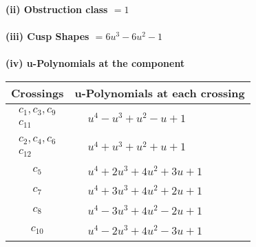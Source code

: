 \documentclass[1p]{elsarticle_modified}
\theoremstyle{definition}
\begin{document}
\flushleft \textbf{(ii) Obstruction class $= 1$}\\~\\
\flushleft \textbf{(iii) Cusp Shapes $= 6 u^3-6 u^2-1$}\\~\\
\newpage\renewcommand{\arraystretch}{1}
\flushleft \textbf{(iv) u-Polynomials at the component}\newline \\
\begin{tabular}{m{50pt}|m{274pt}}
Crossings & \hspace{64pt}u-Polynomials at each crossing \\
\hline $$\begin{aligned}c_{1},c_{3},c_{9}\\c_{11}\end{aligned}$$&$\begin{aligned}
&u^4- u^3+u^2- u+1
\end{aligned}$\\
\hline $$\begin{aligned}c_{2},c_{4},c_{6}\\c_{12}\end{aligned}$$&$\begin{aligned}
&u^4+u^3+u^2+u+1
\end{aligned}$\\
\hline $$\begin{aligned}c_{5}\end{aligned}$$&$\begin{aligned}
&u^4+2 u^3+4 u^2+3 u+1
\end{aligned}$\\
\hline $$\begin{aligned}c_{7}\end{aligned}$$&$\begin{aligned}
&u^4+3 u^3+4 u^2+2 u+1
\end{aligned}$\\
\hline $$\begin{aligned}c_{8}\end{aligned}$$&$\begin{aligned}
&u^4-3 u^3+4 u^2-2 u+1
\end{aligned}$\\
\hline $$\begin{aligned}c_{10}\end{aligned}$$&$\begin{aligned}
&u^4-2 u^3+4 u^2-3 u+1
\end{aligned}$\\
\hline
\end{tabular}\\~\\
\end{document}
